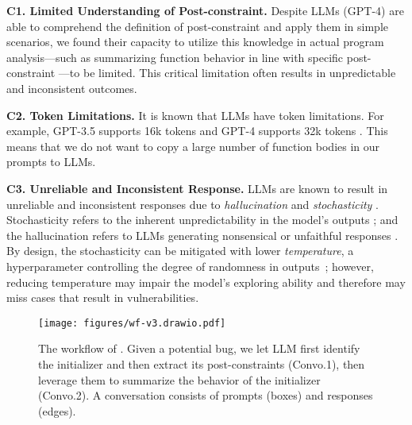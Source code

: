 \squishlist
\item \textbf{C1. Limited Understanding of Post-constraint.} 
Despite LLMs (\eg GPT-4) are able to comprehend the definition of post-constraint and apply them in simple scenarios, we found their capacity to utilize this knowledge in actual program analysis—such as summarizing function behavior in line with specific post-constraint —to be limited. This critical limitation often results in unpredictable and inconsistent outcomes.



\item \textbf{C2. Token Limitations.} It is known that \acp{LLM} have token limitations. For example, GPT-3.5 supports 16k tokens and GPT-4 supports 32k 
tokens \cite{openai_2023_function}. This means that we do not want to copy a large number of function bodies in our prompts to LLMs.




\item \textbf{C3. Unreliable and Inconsistent Response. }
LLMs are known to result in unreliable and inconsistent responses due to
\textit{hallucination} and \textit{stochasticity} \cite{zhao2023survey}.
Stochasticity refers to the inherent unpredictability in the model's outputs \cite{vaswani_attention_2017}; and the hallucination refers to LLMs generating nonsensical or unfaithful responses \cite{ji_survey_2023, zheng_why_2023}.
By design, the stochasticity can be mitigated with lower \textit{temperature}, a hyperparameter controlling the degree of randomness in outputs~\cite{salamone_what_temp_2021}; however, 
 reducing temperature may impair the model's exploring ability  \cite{xu_systematic_2022} and therefore 
 may miss  cases that result in vulnerabilities.



\squishend





\begin{figure}
  \centering
  \texttt{[image: figures/wf-v3.drawio.pdf]}
  \caption{The workflow of \work. Given a potential bug, we let LLM first identify the initializer and then extract its post-constraints (Convo.1),  
  then leverage them to summarize the behavior of the initializer (Convo.2).
   A conversation consists of prompts (boxes) and responses (edges).} 
  \label{fig:wf}
\end{figure}


